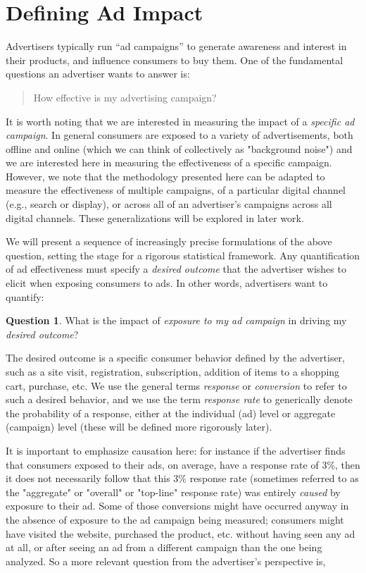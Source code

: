 \documentclass[11pt,a4paper]{article}
\theoremstyle{definition}
\theoremstyle{remark}
\theoremstyle{definition}
\theoremstyle{definition}
\theoremstyle{definition}
\newtheorem{question}{Question}[section]
\theoremstyle{definition}
\theoremstyle{definition}
\theoremstyle{definition}
\begin{document}
\section{Defining Ad Impact} \label{sec-define}

Advertisers typically run “ad campaigns” to generate awareness and interest in their products, and influence consumers to buy them. One of the fundamental questions an advertiser wants to answer is: 
\begin{quote}
How effective is my advertising campaign?	
\end{quote}


It is worth noting that we are interested in measuring the impact of a \textit{specific ad campaign}. In general consumers are exposed to a variety of advertisements, both offline and online (which we can think of collectively as "background noise") and we are interested here in measuring the effectiveness of a specific campaign. However, we note that the methodology presented here can be adapted to measure the effectiveness of multiple campaigns, of a particular digital channel (e.g., search or display), or across all of an advertiser’s campaigns across all digital channels. These generalizations will be explored in later work. 

We will present a sequence of increasingly precise formulations of the above question, setting the stage for a rigorous statistical framework. 
Any quantification of ad effectiveness must specify a {\em desired outcome} that the advertiser wishes to elicit when exposing consumers to ads. In other words, advertisers want to quantify:

\begin{question}
What is the impact of {\em exposure to my ad campaign} in driving my {\em desired outcome}? 	
\end{question}


 
The desired outcome is a specific consumer behavior defined by the advertiser, such as a site visit, registration, subscription, addition of items to a shopping cart, purchase, etc. We use the general terms {\em response} or {\em conversion} to refer to such a desired behavior, and we use the term  {\em response rate} to generically denote the probability of a response, either at the individual (ad) level or aggregate (campaign) level (these will be defined more rigorously later).

It is important to emphasize causation here: for instance if the advertiser finds that consumers exposed to their ads, on average, have a response rate of 3\%, then it does not necessarily follow that this 3\% response rate (sometimes referred to as the "aggregate" or "overall" or "top-line" response rate) was entirely {\em caused} by exposure to their ad. Some of those conversions might have occurred anyway in the absence of exposure to the ad campaign being measured; consumers might have visited the website, purchased the product, etc. without having seen any ad at all, or after seeing an ad from a different campaign than the one being analyzed. So a more relevant question from the advertiser's perspective is, 
\end{document}
